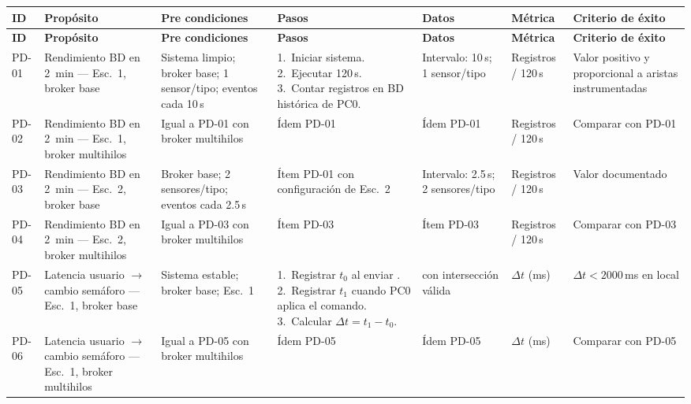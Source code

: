 \documentclass[12pt, a4paper]{article}
\let\oldtexttt\texttt
\renewcommand{\texttt}[1]{\oldtexttt{\seqsplit{#1}}}
\begin{document}
\begin{footnotesize}
\renewcommand{\arraystretch}{1.3}
\setlength{\tabcolsep}{3pt}
\begin{longtable}{|L{0.7cm}|L{2.3cm}|L{2.3cm}|L{2.3cm}|L{2.0cm}|L{2.0cm}|L{2.3cm}|}
\hline
\textbf{ID} & \textbf{Propósito} & \textbf{Pre condiciones} & \textbf{Pasos} & \textbf{Datos} & \textbf{Métrica} & \textbf{Criterio de éxito} \\
\hline
\endfirsthead
\hline
\textbf{ID} & \textbf{Propósito} & \textbf{Pre condiciones} & \textbf{Pasos} & \textbf{Datos} & \textbf{Métrica} & \textbf{Criterio de éxito} \\
\hline
\endhead

PD-01 &
Rendimiento BD en 2~min --- Esc.~1, broker base &
Sistema limpio; broker base; 1 sensor/tipo; eventos cada 10\,s &
1.~Iniciar sistema. 2.~Ejecutar 120\,s. 3.~Contar registros en BD histórica de PC0. &
Intervalo: 10\,s; 1 sensor/tipo &
Registros / 120\,s &
Valor positivo y proporcional a aristas instrumentadas \\
\hline

PD-02 &
Rendimiento BD en 2~min --- Esc.~1, broker multihilos &
Igual a PD-01 con broker multihilos &
Ídem PD-01 &
Ídem PD-01 &
Registros / 120\,s &
Comparar con PD-01 \\
\hline

PD-03 &
Rendimiento BD en 2~min --- Esc.~2, broker base &
Broker base; 2 sensores/tipo; eventos cada 2.5\,s &
Ítem PD-01 con configuración de Esc.~2 &
Intervalo: 2.5\,s; 2 sensores/tipo &
Registros / 120\,s &
Valor documentado \\
\hline

PD-04 &
Rendimiento BD en 2~min --- Esc.~2, broker multihilos &
Igual a PD-03 con broker multihilos &
Ítem PD-03 &
Ítem PD-03 &
Registros / 120\,s &
Comparar con PD-03 \\
\hline

PD-05 &
Latencia usuario $\to$ cambio semáforo --- Esc.~1, broker base &
Sistema estable; broker base; Esc.~1 &
1.~Registrar $t_0$ al enviar \texttt{control\_\allowbreak manual}. 2.~Registrar $t_1$ cuando PC0 aplica el comando. 3.~Calcular $\Delta t = t_1 - t_0$. &
\texttt{control\_\allowbreak manual} con intersección válida &
$\Delta t$ (ms) &
$\Delta t < 2000$\,ms en local \\
\hline

PD-06 &
Latencia usuario $\to$ cambio semáforo --- Esc.~1, broker multihilos &
Igual a PD-05 con broker multihilos &
Ídem PD-05 &
Ídem PD-05 &
$\Delta t$ (ms) &
Comparar con PD-05 \\
\hline


\end{longtable}
\end{footnotesize}
\end{document}
